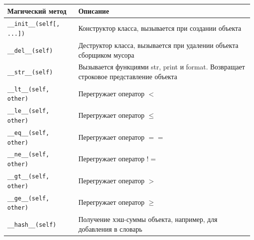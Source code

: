 \begin{table}[h!]
\centering
\small
\begin{longtable}{|p{7cm}|p{8cm}|}
\hline 
Магический метод & Описание \\\hline

\texttt{\_\_init\_\_(self[, ...])} & Конструктор класса, вызывается при создании объекта \\

\texttt{\_\_del\_\_(self)} & Деструктор класса, вызывается при удалении объекта сборщиком мусора \\


\texttt{\_\_str\_\_(self)} & Вызывается функциями str, print и format. Возвращает строковое представление объекта \\\hline



\texttt{\_\_lt\_\_(self, other)} & Перегружает оператор $<$ \\

\texttt{\_\_le\_\_(self, other)} & Перегружает оператор $\le$ \\

\texttt{\_\_eq\_\_(self, other)} & Перегружает оператор $==$ \\

\texttt{\_\_ne\_\_(self, other)} & Перегружает оператор $!=$ \\

\texttt{\_\_gt\_\_(self, other)} & Перегружает оператор $>$ \\

\texttt{\_\_ge\_\_(self, other)} & Перегружает оператор $\ge$ \\

\texttt{\_\_hash\_\_(self)} & Получение хэш-суммы объекта, например, для добавления в словарь \\



\end{longtable}
\end{table}
